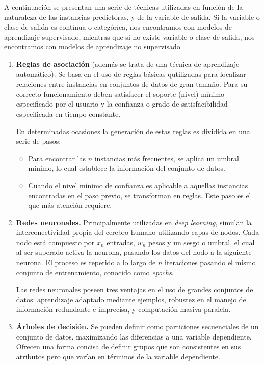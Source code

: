 A continuación se presentan una serie de técnicas utilizadas en función de la naturaleza de las instancias predictoras, y de la variable de salida. Si la variable o clase de salida es continua o categórica, nos encontramos con modelos de aprendizaje supervisado, mientras que si no existe variable o clase de salida, nos encontramos con modelos de aprendizaje no supervisado~\cite{palmer2011data}

\begin{enumerate}
	\item \textbf{Reglas de asociación} (además se trata de una técnica de aprendizaje automático). Se basa en el uso de reglas básicas qutilizadas para localizar relaciones entre instancias en conjuntos de datos de gran tamaño. Para su correcto funcionamiento deben satisfacer el soporte (nivel) mínimo especificado por el usuario y la confianza o grado de satisfacibilidad especificada en tiempo constante.
	
	En determinadas ocasiones la generación de estas reglas es dividida en una serie de pasos:
	\begin{itemize}
	\item Para encontrar las $n$ instancias más frecuentes, se aplica un umbral mínimo, lo cual establece la información del conjunto de datos.
	\item Cuando el nivel mínimo de confianza es aplicable a aquellas instancias encontradas en el paso previo, se transforman en reglas. Este paso es el que más atención requiere.
	\end{itemize}
	\item \textbf{Redes neuronales.} Principalmente utilizadas en \textit{deep learning}, simulan la interconectividad propia del cerebro humano utilizando capas de nodos. Cada nodo está compuesto por \(x_n\) entradas, \(w_n\) pesos y un sesgo o umbral, el cual al ser superado activa la neurona, pasando los datos del nodo a la siguiente neurona. El proceso es repetido a lo largo de $n$ iteraciones pasando el mismo conjunto de entrenamiento, conocido como \textit{epochs}.
	
	Las redes neuronales poseen tres ventajas en el uso de grandes conjuntos de datos: aprendizaje adaptado mediante ejemplos, robustez en el manejo de información redundante e imprecisa, y computación masiva paralela.
	\item \textbf{Árboles de decisión.} Se pueden definir como particiones secuenciales de un conjunto de datos, maximizando las diferencias a una variable dependiente. Ofrecen una forma concisa de definir grupos que son consistentes en sus atributos pero que varían en términos de la variable dependiente.
	

\end{enumerate}
